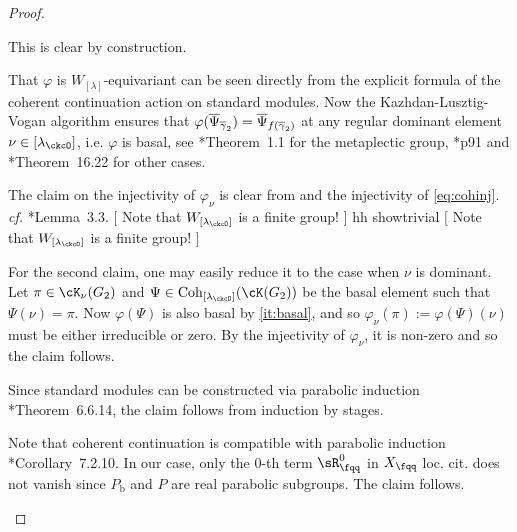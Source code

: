 \documentclass[12pt,a4paper]{amsart}
\newcommand{\trivial}[2][]{\if\relax\detokenize{#1}\relax
  {%
      \color{orange} \vspace{0em} $[$  #2 $]$
      \color{black}
  }
  \else
\ifx#1h
\ifcsname showtrivial\endcsname
{%
    \color{orange} \vspace{0em}  $[$ #2 $]$
    \color{black}
}
\fi
\else {\red Wrong argument!} \fi
\fi
}
\numberwithin{equation}{section}
\theoremstyle{remark}
\def\cf{\emph{cf.} }
\def\Lamck{[\lambda_\ckcO]}
\def\WLam{W_{\Lam}}
\def\WLamck{W_{[\lambda_{\ckcO}]}}
\def\Coh{\mathrm{Coh}}
\def\Pb{P_{\mathrm b}}
\newcommand{\Lam}{{[\lambda]}}
\begin{document}
\begin{proof}
  \begin{enumT}
    \item This is clear by construction.
    \item  That $\varphi$ is $\WLam$-equivariant can be seen directly from the explicit
    formula of the coherent continuation action on standard modules.
    Now the Kazhdan-Lusztig-Vogan algorithm ensures that
    $\varphi(\overline\Psi_{\overline\gamma_{2}}) = \overline\Psi_{f(\overline\gamma_{2})}$ at any regular
    dominant element
    $\nu\in \Lamck$, i.e. $\varphi$ is basal,
    see \cite{RT2}*{Theorem~1.1} for the metaplectic group, \cite{GI}*{p91} and
    \cite{ABV}*{Theorem~16.22} for other cases.
    \item The claim on the injectivity of $\varphi_{\nu}$ is clear from
     and the injectivity of \eqref{eq:cohinj}. \cf \cite{GI}*{Lemma~3.3}.
        \trivial[h]{Note
      that $\WLamck$ is a finite group!}

    For the second claim, one may
    easily reduce it to the case when $\nu$ is dominant. Let
  $\pi \in \cK_{\nu}(G_{2})$ and $\Psi\in \Coh_{\Lamck}(\cK(G_{2}))$ be the
  basal element such that $\Psi(\nu)=\pi$. Now $\varphi(\Psi)$ is also basal by
  \ref{it:basal}, and so $\varphi_{\nu}(\pi):=\varphi(\Psi)(\nu)$ must be
  either irreducible or zero.
  By the injectivity of $\varphi_{\nu}$, it is non-zero and so the
    claim follows.
    \item Since standard modules can be constructed via
   parabolic induction \cite{Vg}*{Theorem~6.6.14}, the claim follows from induction by stages.
   \item Note that coherent continuation is compatible with parabolic induction
   \cite{Vg}*{Corollary~7.2.10}. In our case, only the $0$-th term $\sR_{\fqq}^{0}$ in $X_{\fqq}$ loc.
   cit. does not vanish since $\Pb$ and $P$ are real parabolic subgroups.
   The claim follows.
  \end{enumT}
\end{proof}
\end{document}
